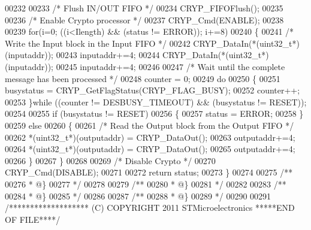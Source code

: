 \begin{DoxyCode}
00232 
00233   \textcolor{comment}{/* Flush IN/OUT FIFO */}
00234   CRYP_FIFOFlush();
00235 
00236   \textcolor{comment}{/* Enable Crypto processor */}
00237   CRYP_Cmd(ENABLE);
00238 
00239   \textcolor{keywordflow}{for}(i=0; ((i<Ilength) && (status != ERROR)); i+=8)
00240   \{
00241     \textcolor{comment}{/* Write the Input block in the Input FIFO */}
00242     CRYP\_DataIn(*(uint32\_t*)(inputaddr));
00243     inputaddr+=4;
00244     CRYP\_DataIn(*(uint32\_t*)(inputaddr));
00245     inputaddr+=4;
00246 
00247     \textcolor{comment}{/* Wait until the complete message has been processed */}
00248     counter = 0;
00249     \textcolor{keywordflow}{do}
00250     \{
00251       busystatus = CRYP\_GetFlagStatus(CRYP_FLAG_BUSY);
00252       counter++;
00253     \}\textcolor{keywordflow}{while} ((counter != DESBUSY_TIMEOUT) && (busystatus != RESET));
00254 
00255     \textcolor{keywordflow}{if} (busystatus != RESET)
00256    \{
00257        status = ERROR;
00258     \}
00259     \textcolor{keywordflow}{else}
00260     \{
00261       \textcolor{comment}{/* Read the Output block from the Output FIFO */}
00262       *(uint32\_t*)(outputaddr) = CRYP\_DataOut();
00263       outputaddr+=4;
00264       *(uint32\_t*)(outputaddr) = CRYP\_DataOut();
00265       outputaddr+=4;
00266     \}
00267   \}
00268 
00269   \textcolor{comment}{/* Disable Crypto */}
00270   CRYP_Cmd(DISABLE);
00271 
00272   \textcolor{keywordflow}{return} status;
00273 \}
00274 
00275 \textcolor{comment}{/**}
00276 \textcolor{comment}{  * @\}}
00277 \textcolor{comment}{  */}
00278 
00279 \textcolor{comment}{/**}
00280 \textcolor{comment}{  * @\}}
00281 \textcolor{comment}{  */}
00282 
00283 \textcolor{comment}{/**}
00284 \textcolor{comment}{  * @\}}
00285 \textcolor{comment}{  */}
00286 
00287 \textcolor{comment}{/**}
00288 \textcolor{comment}{  * @\}}
00289 \textcolor{comment}{  */}
00290 
00291 \textcolor{comment}{/******************* (C) COPYRIGHT 2011 STMicroelectronics *****END OF FILE****/}
\end{DoxyCode}
